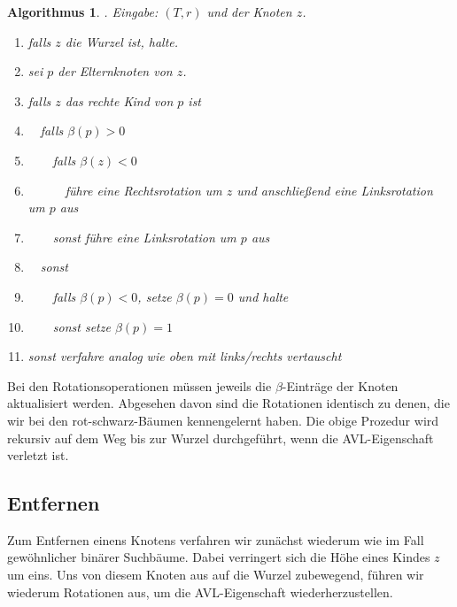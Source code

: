 \documentclass[10pt,reqno]{amsart}
\numberwithin{equation}{section}
\newtheorem{algorithm}[definition]{Algorithmus}
\begin{document}
\begin{algorithm}. {\em Eingabe:} $(T,r)$ und der Knoten $z$.
	\begin{enumerate}
		\item falls $z$ die Wurzel ist, halte.
		\item sei $p$ der Elternknoten von $z$.
		\item falls $z$ das rechte Kind von $p$ ist
		\item $\quad$falls $\beta(p)>0$
		\item $\qquad$falls $\beta(z)<0$
		\item $\quad\qquad$f\"uhre eine Rechtsrotation um $z$ und anschlie\ss end eine Linksrotation um $p$ aus
		\item $\qquad$sonst f\"uhre eine Linksrotation um $p$ aus
		\item $\quad$sonst
		\item $\qquad$falls $\beta(p)<0$, setze $\beta(p)=0$ und halte
		\item $\qquad$sonst setze $\beta(p)=1$ %
		\item sonst verfahre analog wie oben mit links/rechts vertauscht
	\end{enumerate}
\end{algorithm}

Bei den Rotationsoperationen m\"ussen jeweils die $\beta$-Eintr\"age der Knoten aktualisiert werden.
Abgesehen davon sind die Rotationen identisch zu denen, die wir bei den rot-schwarz-B\"aumen kennengelernt haben.
Die obige Prozedur wird rekursiv auf dem Weg bis zur Wurzel durchgef\"uhrt, wenn die AVL-Eigenschaft verletzt ist.

\subsection{Entfernen}\label{sec_avl_delete}
Zum Entfernen einens Knotens verfahren wir zun\"achst wiederum wie im Fall gew\"ohnlicher bin\"arer Suchb\"aume.
Dabei verringert sich die H\"ohe eines Kindes $z$ um eins.
Uns von diesem Knoten aus auf die Wurzel zubewegend, f\"uhren wir wiederum Rotationen aus, um die AVL-Eigenschaft wiederherzustellen.
\end{document}
